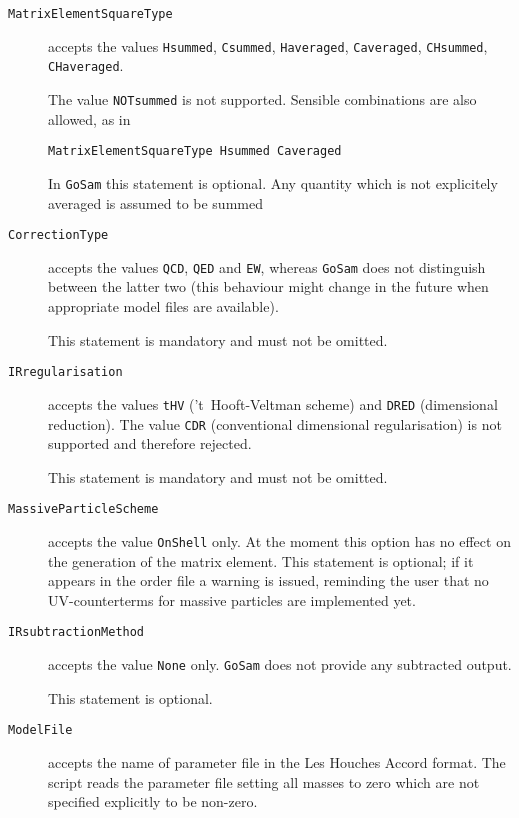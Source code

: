 \documentclass[11pt,a4paper]{refrep}
\newcommand{\golemversion}{{1{.}0}}
\newcommand{\golemv}[1][\golemversion]{{\tt GoSam}\xspace}
\begin{document}
\begin{description}
\item[\texttt{MatrixElementSquareType}] accepts the values
	\lstinline!Hsummed!, \lstinline!Csummed!,
	\lstinline!Haveraged!, \lstinline!Caveraged!,
	\lstinline!CHsummed!, \lstinline!CHaveraged!.

	The value \lstinline!NOTsummed! is not supported. 
	Sensible combinations are also allowed, as in
\begin{lstlisting}[language=olp]
MatrixElementSquareType Hsummed Caveraged
\end{lstlisting}

        In \golemv{} this statement is optional.
	Any quantity which is not explicitely averaged is assumed to be
	summed
\item[\texttt{CorrectionType}] accepts the values
        \lstinline!QCD!, \lstinline!QED! and \lstinline!EW!, whereas
	\golemv{} does not distinguish between the latter two (this behaviour
	might change in the future when appropriate model files are available).

	This statement is mandatory and must not be omitted.
\item[\texttt{IRregularisation}] accepts the values \lstinline!tHV!
        ('t~Hooft-Veltman scheme) and \lstinline!DRED! (dimensional reduction).
	The value \lstinline!CDR! (conventional dimensional regularisation)
	is not supported and therefore rejected.


	This statement is mandatory and must not be omitted.
\item[\texttt{MassiveParticleScheme}] accepts the value \lstinline!OnShell!
	only.
	At the moment this option has no effect on the generation of the matrix
	element. This statement is optional; if it appears in the order file
	a warning is issued, reminding the user that no UV-counterterms for
	massive particles are implemented yet.
\item[\texttt{IRsubtractionMethod}] accepts the value \lstinline!None! only.
	\golemv{} does not provide any subtracted output.

	This statement is optional.
\item[\texttt{ModelFile}] accepts the name of parameter file in the
	Les Houches Accord format. The script reads the parameter file
	setting all masses to zero which are not specified explicitly
	to be non-zero.


\end{description}
\end{document}

